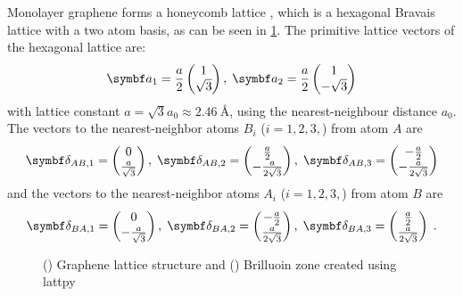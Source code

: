 \documentclass[../notes.tex]{subfiles}
\begin{document}
Monolayer graphene forms a honeycomb lattice \cite{yangStructureGrapheneIts2018}, which is a hexagonal Bravais lattice with a two atom basis, as can be seen in \cref{sfig:graphene lattice structure}.
The primitive lattice vectors of the hexagonal lattice are:
\begin{align}
	\vb{a}_1 = \frac{a}{2} \begin{pmatrix} 1 \\ \sqrt{3} \end{pmatrix}, \; \vb{a}_2 = \frac{a}{2} \begin{pmatrix} 1 \\ -\sqrt{3} \end{pmatrix}
\end{align}
with lattice constant \(a = \sqrt{3} a_0 \approx \SI{2.46}{\angstrom}\), using the nearest-neighbour distance \(a_0\).
The vectors to the nearest-neighbor atoms \(B_i\) (\(i = 1, 2, 3,\)) from atom \(A\) are
\begin{align}
	\vb{\delta}_{AB, 1} = \begin{pmatrix} 0 \\ \frac{a}{\sqrt{3}} \end{pmatrix},\; \vb{\delta}_{AB, 2} = \begin{pmatrix} \frac{a}{2} \\ -\frac{a}{2\sqrt{3}} \end{pmatrix},\; \vb{\delta}_{AB, 3} = \begin{pmatrix} -\frac{a}{2} \\ -\frac{a}{2\sqrt{3}} \end{pmatrix}
\end{align}
and the vectors to the nearest-neighbor atoms \(A_i\) (\(i = 1, 2, 3,\)) from atom \(B\) are
\begin{align}
	\vb{\delta}_{BA, 1} = \begin{pmatrix} 0 \\ -\frac{a}{\sqrt{3}} \end{pmatrix},\; \vb{\delta}_{BA, 2} = \begin{pmatrix} -\frac{a}{2} \\ \frac{a}{2\sqrt{3}} \end{pmatrix},\; \vb{\delta}_{BA, 3} = \begin{pmatrix} \frac{a}{2} \\ \frac{a}{2\sqrt{3}} \end{pmatrix} \;.
\end{align}
\begin{figure}[tb]
	\centering
	\begin{subfigure}[t]{0.5\textwidth}
		\centering
		\caption{\hfill\null}\label{sfig:graphene lattice structure}
		
	\end{subfigure}%
	\begin{subfigure}[t]{0.5\textwidth}
		\centering
		\caption{\hfill\null}\label{sfig:graphene Brillouin zone}
		
	\end{subfigure}
	\caption{() Graphene lattice structure and () Brilluoin zone created using lattpy \cite{Jones_lattpy_2022}}
	\label{fig:Graphene lattice structure and Brilluoin zone}
\end{figure}
\end{document}
